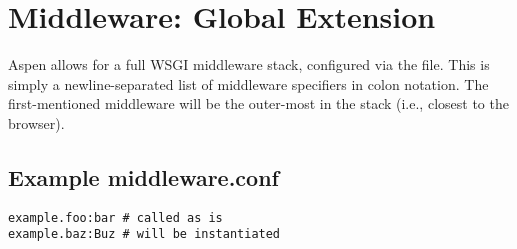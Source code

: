 \section{Middleware: Global Extension \label{middleware}}

Aspen allows for a full WSGI middleware stack, configured via the
 file. This is simply a newline-separated list of
middleware specifiers in colon notation. The first-mentioned middleware will be
the outer-most in the stack (i.e., closest to the browser).

\subsection{Example middleware.conf}

\begin{verbatim}
example.foo:bar # called as is
example.baz:Buz # will be instantiated
\end{verbatim}
